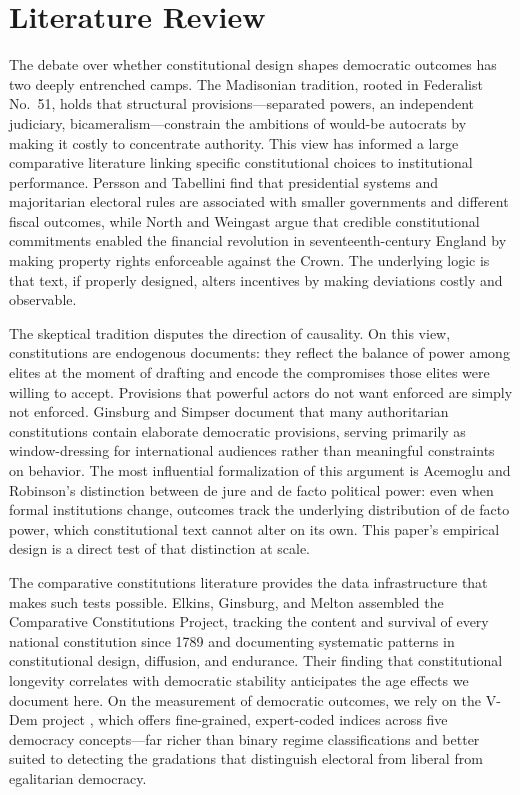 \documentclass[9pt,twoside]{pnas-new}
\begin{document}
\section*{Literature Review}

The debate over whether constitutional design shapes democratic outcomes has two deeply entrenched camps. The Madisonian tradition, rooted in Federalist No.~51, holds that structural provisions---separated powers, an independent judiciary, bicameralism---constrain the ambitions of would-be autocrats by making it costly to concentrate authority. This view has informed a large comparative literature linking specific constitutional choices to institutional performance. Persson and Tabellini \cite{persson_tabellini_2003} find that presidential systems and majoritarian electoral rules are associated with smaller governments and different fiscal outcomes, while North and Weingast \cite{north_weingast_1989} argue that credible constitutional commitments enabled the financial revolution in seventeenth-century England by making property rights enforceable against the Crown. The underlying logic is that text, if properly designed, alters incentives by making deviations costly and observable.

The skeptical tradition disputes the direction of causality. On this view, constitutions are endogenous documents: they reflect the balance of power among elites at the moment of drafting and encode the compromises those elites were willing to accept. Provisions that powerful actors do not want enforced are simply not enforced. Ginsburg and Simpser \cite{ginsburg_simpser_2014} document that many authoritarian constitutions contain elaborate democratic provisions, serving primarily as window-dressing for international audiences rather than meaningful constraints on behavior. The most influential formalization of this argument is Acemoglu and Robinson's \cite{acemoglu_robinson_2006} distinction between de jure and de facto political power: even when formal institutions change, outcomes track the underlying distribution of de facto power, which constitutional text cannot alter on its own. This paper's empirical design is a direct test of that distinction at scale.

The comparative constitutions literature provides the data infrastructure that makes such tests possible. Elkins, Ginsburg, and Melton \cite{elkins_ginsburg_melton_2009} assembled the Comparative Constitutions Project, tracking the content and survival of every national constitution since 1789 and documenting systematic patterns in constitutional design, diffusion, and endurance. Their finding that constitutional longevity correlates with democratic stability anticipates the age effects we document here. On the measurement of democratic outcomes, we rely on the V-Dem project \cite{coppedge_vdem_2024}, which offers fine-grained, expert-coded indices across five democracy concepts---far richer than binary regime classifications and better suited to detecting the gradations that distinguish electoral from liberal from egalitarian democracy.
\end{document}
